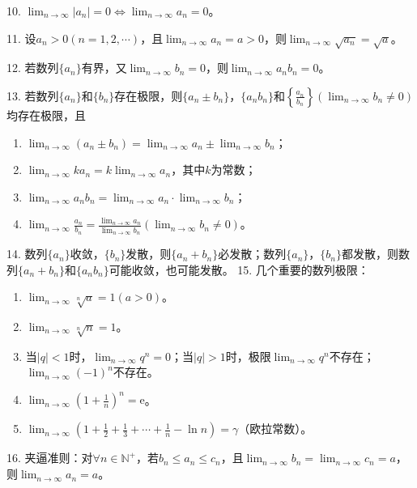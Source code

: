 \documentclass[UTF8]{ctexart}
\theoremstyle{remark}
\begin{document}
	10. \(\lim_{n\rightarrow\infty}|a_n| = 0\Leftrightarrow\lim_{n\rightarrow\infty}a_n = 0\)。
	
	11. 设\(a_n>0(n = 1,2,\cdots)\)，且\(\lim_{n\rightarrow\infty}a_n = a>0\)，则\(\lim_{n\rightarrow\infty}\sqrt{a_n}=\sqrt{a}\)。

	12. 若数列\(\{a_n\}\)有界，又\(\lim_{n\rightarrow\infty}b_n = 0\)，则\(\lim_{n\rightarrow\infty}a_nb_n = 0\)。
	
	13. 若数列\(\{a_n\}\)和\(\{b_n\}\)存在极限，则\(\{a_n\pm b_n\}\)，\(\{a_nb_n\}\)和\(\left\{\frac{a_n}{b_n}\right\}(\lim_{n\rightarrow\infty}b_n\neq0)\)均存在极限，且
	\begin{enumerate}
		\item \(\lim_{n\rightarrow\infty}(a_n\pm b_n)=\lim_{n\rightarrow\infty}a_n\pm\lim_{n\rightarrow\infty}b_n\)；
		\item \(\lim_{n\rightarrow\infty}ka_n = k\lim_{n\rightarrow\infty}a_n\)，其中\(k\)为常数；
		\item \(\lim_{n\rightarrow\infty}a_nb_n=\lim_{n\rightarrow\infty}a_n\cdot\lim_{n\rightarrow\infty}b_n\)；
		\item \(\lim_{n\rightarrow\infty}\frac{a_n}{b_n}=\frac{\lim_{n\rightarrow\infty}a_n}{\lim_{n\rightarrow\infty}b_n}(\lim_{n\rightarrow\infty}b_n\neq0)\)。
	\end{enumerate}
	
	14. 数列\(\{a_n\}\)收敛，\(\{b_n\}\)发散，则\(\{a_n + b_n\}\)必发散；数列\(\{a_n\}\)，\(\{b_n\}\)都发散，则数列\(\{a_n + b_n\}\)和\(\{a_nb_n\}\)可能收敛，也可能发散。
	15. 几个重要的数列极限：
	\begin{enumerate}
		\item \(\lim_{n\rightarrow\infty}\sqrt[n]{a}=1(a > 0)\)。
		\item \(\lim_{n\rightarrow\infty}\sqrt[n]{n}=1\)。
		\item 当\(|q| < 1\)时，\(\lim_{n\rightarrow\infty}q^n = 0\)；当\(|q| > 1\)时，极限\(\lim_{n\rightarrow\infty}q^n\)不存在；\(\lim_{n\rightarrow\infty}(-1)^n\)不存在。
		\item \(\lim_{n\rightarrow\infty}(1 + \frac{1}{n})^n = \mathrm{e}\)。
		\item \(\lim_{n\rightarrow\infty}(1 + \frac{1}{2} + \frac{1}{3} + \cdots + \frac{1}{n} - \ln n)=\gamma\)（欧拉常数）。
	\end{enumerate}
	
	16. 夹逼准则：对\(\forall n\in\mathbb{N}^+\)，若\(b_n\leq a_n\leq c_n\)，且\(\lim_{n\rightarrow\infty}b_n = \lim_{n\rightarrow\infty}c_n = a\)，则\(\lim_{n\rightarrow\infty}a_n = a\)。
	
\end{document}
